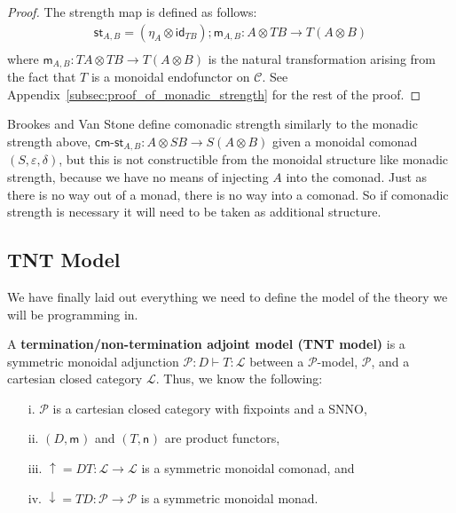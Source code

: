 \documentclass{article}
\let\mto\to
\let\to\rightarrow
\newcommand{\cat}[1]{\mathcal{#1}}
\newcommand{\uar}[0]{\mathop{\uparrow}}
\newcommand{\dar}[0]{\mathop{\downarrow}}
\newcommand{\cmst}[1]{\mathsf{cm\text{-}st}_{#1}}
\newcommand{\st}[1]{\mathsf{st}_{#1}}
\newcommand{\id}[0]{\mathsf{id}}
\newcommand{\m}[1]{\mathsf{m}_{#1}}
\newcommand{\n}[1]{\mathsf{n}_{#1}}
\begin{document}
\begin{proof}
The strength map is defined as follows:
  \[
  \begin{array}{lll}
    \st{A,B} = (\eta_{A} \otimes \id_{TB});\m{A,B} : A \otimes TB \mto T(A \otimes B)\\    
  \end{array}
  \]
  where $\m{A,B} : TA \otimes TB \mto T(A \otimes B)$ is the natural
  transformation arising from the fact that $T$ is a monoidal
  endofunctor on $\cat{C}$.  See
  Appendix~\ref{subsec:proof_of_monadic_strength} for the rest of the
  proof.
\end{proof}
Brookes and Van Stone \cite{?} define comonadic strength similarly to
the monadic strength above, $\cmst{A,B} : A \otimes SB \mto S(A
\otimes B)$ given a monoidal comonad $(S,\varepsilon,\delta)$, but
this is not constructible from the monoidal structure like monadic
strength, because we have no means of injecting $A$ into the comonad.
Just as there is no way out of a monad, there is no way into a
comonad. So if comonadic strength is necessary it will need to be
taken as additional structure.

\subsection{TNT Model}
\label{subsec:tnt_model}
We have finally laid out everything we need to define the model of the
theory we will be programming in.
\begin{definition}
  \label{def:TNT-model}
  A \textbf{termination/non-termination adjoint model (TNT model)} is
  a symmetric monoidal adjunction $\cat{P} : D \vdash T : \cat{L}$
  between a $\cat{P}$-model, $\cat{P}$, and a cartesian closed
  category $\cat{L}$.  Thus, we know the following:
  \begin{itemize}
  \item[i.] $\cat{P}$ is a cartesian closed category with fixpoints and a SNNO,
  \item[ii.] $(D,\m{})$ and $(T, \n{})$ are product functors,
  \item[iii.] $\uar = DT : \cat{L} \to \cat{L}$ is a symmetric monoidal
    comonad, and
  \item[iv.] $\dar = TD : \cat{P} \to \cat{P}$ is a symmetric monoidal
    monad.
  \end{itemize}
\end{definition}
\end{document}
